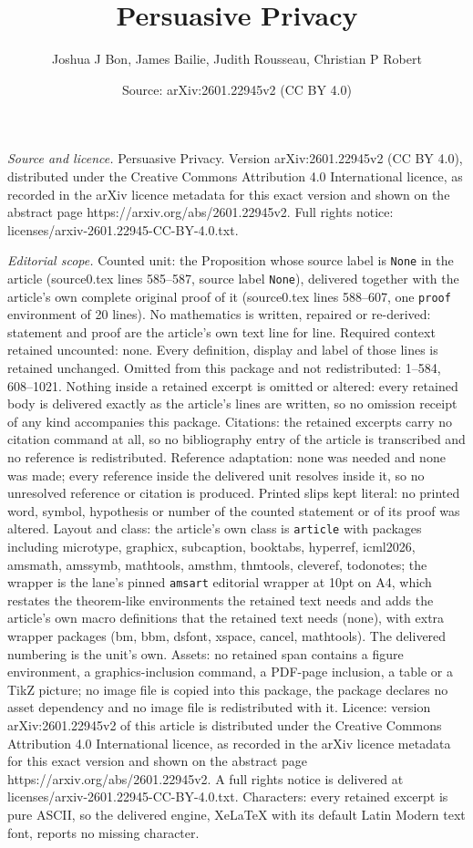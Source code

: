 \documentclass[10pt,a4paper]{amsart}
\title[Persuasive Privacy]{Persuasive Privacy}
\author{Joshua J Bon, James Bailie, Judith Rousseau, Christian P Robert}
\date{Source: arXiv:2601.22945v2 (CC BY 4.0)}
\begin{document}
\maketitle

\noindent\emph{Source and licence.} Persuasive Privacy. Version arXiv:2601.22945v2 (CC BY 4.0), distributed under the Creative Commons Attribution 4.0 International licence, as recorded in the arXiv licence metadata for this exact version and shown on the abstract page https://arxiv.org/abs/2601.22945v2. Full rights notice: licenses/arxiv-2601.22945-CC-BY-4.0.txt.\par\smallskip

\noindent\textit{Editorial scope.} Counted unit: the Proposition whose source label is \texttt{None} in the article (source0.tex lines 585--587, source label \texttt{None}), delivered together with the article's own complete original proof of it (source0.tex lines 588--607, one \texttt{proof} environment of 20 lines). No mathematics is written, repaired or re-derived: statement and proof are the article's own text line for line. Required context retained uncounted: none. Every definition, display and label of those lines is retained unchanged. Omitted from this package and not redistributed: 1--584, 608--1021. Nothing inside a retained excerpt is omitted or altered: every retained body is delivered exactly as the article's lines are written, so no omission receipt of any kind accompanies this package. Citations: the retained excerpts carry no citation command at all, so no bibliography entry of the article is transcribed and no reference is redistributed. Reference adaptation: none was needed and none was made; every reference inside the delivered unit resolves inside it, so no unresolved reference or citation is produced. Printed slips kept literal: no printed word, symbol, hypothesis or number of the counted statement or of its proof was altered. Layout and class: the article's own class is \texttt{article} with packages including microtype, graphicx, subcaption, booktabs, hyperref, icml2026, amsmath, amssymb, mathtools, amsthm, thmtools, cleveref, todonotes; the wrapper is the lane's pinned \texttt{amsart} editorial wrapper at 10pt on A4, which restates the theorem-like environments the retained text needs and adds the article's own macro definitions that the retained text needs (none), with extra wrapper packages (bm, bbm, dsfont, xspace, cancel, mathtools). The delivered numbering is the unit's own. Assets: no retained span contains a figure environment, a graphics-inclusion command, a PDF-page inclusion, a table or a TikZ picture; no image file is copied into this package, the package declares no asset dependency and no image file is redistributed with it. Licence: version arXiv:2601.22945v2 of this article is distributed under the Creative Commons Attribution 4.0 International licence, as recorded in the arXiv licence metadata for this exact version and shown on the abstract page https://arxiv.org/abs/2601.22945v2. A full rights notice is delivered at licenses/arxiv-2601.22945-CC-BY-4.0.txt. Characters: every retained excerpt is pure ASCII, so the delivered engine, XeLaTeX with its default Latin Modern text font, reports no missing character.
\end{document}
